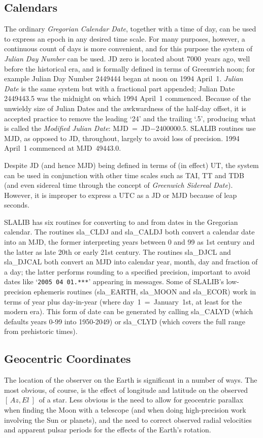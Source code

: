 \documentclass[11pt,twoside]{article}
\newcommand{\azel}      {$[\,Az,El~]$}
\begin{document}
\subsection{Calendars}
The ordinary {\it Gregorian Calendar Date},
together with a time of day, can be
used to express an epoch in any desired time scale.  For many purposes,
however, a continuous count of days is more convenient, and for
this purpose the system of {\it Julian Day Number}\/ can be used.
JD zero is located about 7000~years ago, well before the
historical era, and is formally defined in terms of Greenwich noon;
for example Julian Day Number 2449444 began at noon
on 1994 April~1.  {\it Julian Date}\/
is the same system but with a fractional part appended;
Julian Date 2449443.5 was the midnight on which 1994 April~1
commenced.  Because of the unwieldy size of Julian Dates
and the awkwardness of the half-day offset, it is
accepted practice to remove the leading `24' and the trailing `.5',
producing what is called the {\it Modified Julian Date}:
MJD~=~JD$-2400000.5$.  SLALIB routines use MJD, as opposed to
JD, throughout, largely to avoid loss of precision.
1994 April~1 commenced at MJD~49443.0.

Despite JD (and hence MJD) being defined in terms of (in effect)
UT, the system can be used in conjunction with other time scales
such as TAI, TT and TDB (and even sidereal time through the
concept of {\it Greenwich Sidereal Date}).  However, it is improper
to express a UTC as a JD or MJD because of leap seconds.

SLALIB has six routines for converting to and from dates in
the Gregorian calendar.  The routines
sla\_CLDJ
and
sla\_CALDJ
both convert a calendar date into an MJD, the former interpreting
years between 0 and 99 as 1st century and the latter as late 20th or
early 21st century.  The routines sla\_DJCL
and
sla\_DJCAL
both convert an MJD into calendar year, month, day and fraction of a day;
the latter performs rounding to a specified precision, important
to avoid dates like `{\tt 2005 04 01.***}' appearing in messages.
Some of SLALIB's low-precision ephemeris routines
(sla\_EARTH,
sla\_MOON
and
sla\_ECOR)
work in terms of year plus day-in-year (where
day~1~=~January~1st, at least for the modern era).
This form of date can be generated by
calling
sla\_CALYD
(which defaults years 0-99 into 1950-2049)
or
sla\_CLYD
(which covers the full range from prehistoric times).

\subsection{Geocentric Coordinates}
The location of the observer on the Earth is significant in a
number of ways.  The most obvious, of course, is the effect of
longitude and latitude
on the observed \azel\ of a star.  Less obvious is the need to
allow for geocentric parallax when finding the Moon with a
telescope (and when doing high-precision work involving the
Sun or planets), and the need to correct observed radial
velocities and apparent pulsar periods for the effects
of the Earth's rotation.
\end{document}
